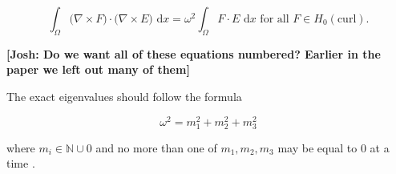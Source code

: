 \documentclass[manuscript,screen]{acmart}
\newcommand{\R}{\mathbb{R}}
\newcommand\akg[1]{\textbf{\textcolor[rgb]{.5,0,1}{[Andrew: #1]}}}
\newcommand\josh[1]{\textbf{\textcolor[rgb]{0,.5,1}{[Josh: #1]}}}
\begin{document}
\begin{equation}
    \int_\Omega \big(\nabla \times F\big) \cdot \big(\nabla \times E \big) \text{ d}x = \omega^2 \int_\Omega F \cdot E \text{ d}x \text{ for all } F \in H_0(\text{curl}).
\end{equation}

\josh{Do we want all of these equations numbered?  Earlier in the paper we left out many of them}


\noindent The exact eigenvalues should follow the formula

\[ \omega^2 = m_1^2 + m_2^2 + m_3^2 \]

\noindent where $m_i \in \mathbb{N} \cup {0}$ and no more than one of $m_1, m_2, m_3$ may be equal to $0$ at a time \cite{rognes2010efficient}.

\end{document}
